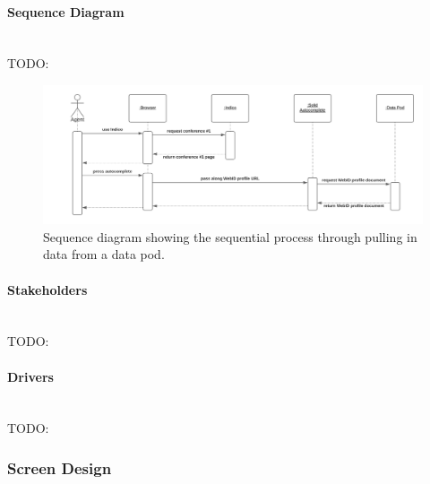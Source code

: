 \paragraph{Sequence Diagram}\mbox{}\\

TODO:

\begin{figure}[H]
    \centering
    \includegraphics[width=\textwidth]{prototype/graphs/poc-conference_registration-autocomplete-sequence_diagram.png}
    \caption{Sequence diagram showing the sequential process through pulling in data from a data pod.}
    \label{fig:poc-conference_registration-autocomplete-sequence_diagram}
\end{figure}

\vspace{0.5cm}
\paragraph{Stakeholders}\mbox{}\\

TODO:
\vspace{0.5cm}
\paragraph{Drivers}\mbox{}\\

TODO:

\subsubsection{Screen Design}\mbox{}\\

